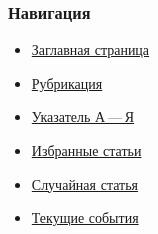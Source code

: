 \documentclass[a4paper,11pt]{article}
\begin{document}
\subsubsection{Навигация}
\begin{itemize}
	\item \href{https://ru.wikipedia.org/wiki/%D0%97%D0%B0%D0%B3%D0%BB%D0%B0%D0%B2%D0%BD%D0%B0%D1%8F_%D1%81%D1%82%D1%80%D0%B0%D0%BD%D0%B8%D1%86%D0%B0}{Заглавная страница}
	\item \href{https://ru.wikipedia.org/wiki/%D0%92%D0%B8%D0%BA%D0%B8%D0%BF%D0%B5%D0%B4%D0%B8%D1%8F:%D0%9F%D0%BE%D0%B8%D1%81%D0%BA_%D0%BF%D0%BE_%D0%BA%D0%B0%D1%82%D0%B5%D0%B3%D0%BE%D1%80%D0%B8%D1%8F%D0%BC}{Рубрикация}
	\item \href{https://ru.wikipedia.org/wiki/%D0%92%D0%B8%D0%BA%D0%B8%D0%BF%D0%B5%D0%B4%D0%B8%D1%8F:%D0%90%D0%BB%D1%84%D0%B0%D0%B2%D0%B8%D1%82%D0%BD%D1%8B%D0%B9_%D1%83%D0%BA%D0%B0%D0%B7%D0%B0%D1%82%D0%B5%D0%BB%D1%8C}{Указатель А — Я}
	\item \href{https://ru.wikipedia.org/wiki/%D0%92%D0%B8%D0%BA%D0%B8%D0%BF%D0%B5%D0%B4%D0%B8%D1%8F:%D0%98%D0%B7%D0%B1%D1%80%D0%B0%D0%BD%D0%BD%D1%8B%D0%B5_%D1%81%D1%82%D0%B0%D1%82%D1%8C%D0%B8}{Избранные статьи}
	\item \href{https://ru.wikipedia.org/wiki/%D0%A1%D0%BB%D1%83%D0%B6%D0%B5%D0%B1%D0%BD%D0%B0%D1%8F:%D0%A1%D0%BB%D1%83%D1%87%D0%B0%D0%B9%D0%BD%D0%B0%D1%8F_%D1%81%D1%82%D1%80%D0%B0%D0%BD%D0%B8%D1%86%D0%B0}{Случайная статья}
	\item \href{https://ru.wikipedia.org/wiki/%D0%9F%D0%BE%D1%80%D1%82%D0%B0%D0%BB:%D0%A2%D0%B5%D0%BA%D1%83%D1%89%D0%B8%D0%B5_%D1%81%D0%BE%D0%B1%D1%8B%D1%82%D0%B8%D1%8F}{Текущие события}
\end{itemize}
\end{document}

